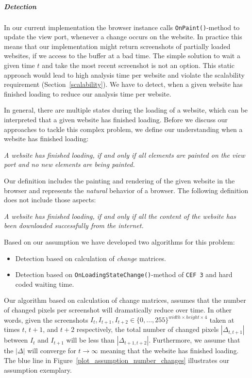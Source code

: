 \subparagraph*{Detection}
\label{datacrawler_detection}
In our current implementation the browser instance calls \texttt{OnPaint()}-method to update the view port, whenever a change occurs on the website. In practice this means that our implementation might return screenshots of partially loaded websites, if we access to the buffer at a bad time. The simple solution to wait a given time $t$ and take the most recent screenshot is not an option. This static approach would lead to high analysis time per website and violate the scalability requirement (Section~\ref{scalability}). We have to detect, when a given website has finished loading to reduce our analysis time per website.

In general, there are multiple states during the loading of a website, which can be interpreted that a given website has finished loading. Before we discuss our approaches to tackle this complex problem, we define our understanding when a website has finished loading:

\begin{center}
	\textit{A website has finished loading, if and only if all elements are painted on the view port and no new elements are being painted.}
\end{center}

Our definition includes the painting and rendering of the given website in the browser and represents the \textit{natural} behavior of a browser. The following definition does not include those aspects:

\begin{center}
	\textit{A website has finished loading, if and only if all the content of the website has been downloaded successfully from the internet.}
\end{center}

Based on our assumption we have developed two algorithms for this problem:

\begin{itemize}
	\item Detection based on calculation of \textit{change} matrices. 
	\item Detection based on \texttt{OnLoadingStateChange()}-method of \texttt{CEF 3} and hard coded waiting time.
\end{itemize}

Our algorithm based on calculation of change matrices, assumes that the number of changed pixels per screenshot will dramatically reduce over time. In other words, given the screenshots $I_{t}, I_{t+1}, I_{t+2}\in \{0, ... , 255\}^{width\times height \times 4}$ taken at times $t$, $t+1$,  and $t+2$ respectively, the total number of changed pixels  $|\Delta_{t,t+1}|$ between $I_{t}$ and $I_{t+1}$ will be less than $|\Delta_{t+1,t+2}|$. Furthermore, we assume that the $|\Delta|$ will converge for $t \rightarrow \infty$ meaning that the website has finished loading. The blue line in Figure~\ref{plot_assumption_number_changes} illustrates our assumption exemplary.

